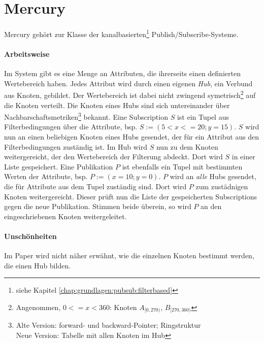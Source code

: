 \section{Mercury}
\label{chap:related:mercury}
Mercury \cite{Bharambe2004Mercury} gehört zur Klasse der kanalbasierten\footnote{siehe Kapitel \ref{chap:grundlagen:pubsub:filterbased}} Publish/Subscribe-Systeme.

\paragraph{Arbeitsweise}
Im System gibt es eine Menge an Attributen, die ihrerseits einen definierten Wertebereich haben. Jedes Attribut wird durch einen eigenen \emph{Hub}, ein Verbund aus Knoten, gebildet. Der Wertebereich ist dabei nicht zwingend symetrisch\footnote{Angenommen, $0<=x<360$: Knoten $A_{[0,270)}$, $B_{[270, 360)}$} auf die Knoten verteilt. Die Knoten eines Hubs sind sich untereinander über Nachbarschaftsmetriken\footnote{Alte Version: forward- und backward-Pointer; Ringstruktur\\Neue Version: Tabelle mit allen Knoten im Hub} bekannt.
Eine Subscription $S$ ist ein Tupel aus Filterbedingungen über die Attribute, bsp. $S := (5 < x <= 20; y = 15)$. $S$ wird nun an einen beliebigen Knoten eines Hubs gesendet, der für ein Attribut aus den Filterbedingungen zuständig ist. Im Hub wird $S$ nun zu dem Knoten weitergereicht, der den Wertebereich der Filterung abdeckt. Dort wird $S$ in einer Liste gespeichert.
Eine Publikation $P$ ist ebenfalls ein Tupel mit bestimmten Werten der Attribute, bsp. $P := (x = 10; y = 0)$. $P$ wird an \emph{alle} Hubs gesendet, die für Attribute aus dem Tupel zuständig sind. Dort wird $P$ zum zustädnigen Knoten weitergereicht. Dieser prüft nun die Liste der gespeicherten Subscriptions gegen die neue Publikation. Stimmen beide überein, so wird $P$ an den eingeschriebenen Knoten weitergeleitet.

\paragraph{Unschönheiten}
Im Paper wird nicht näher erwähnt, wie die einzelnen Knoten bestimmt werden, die einen Hub bilden.
